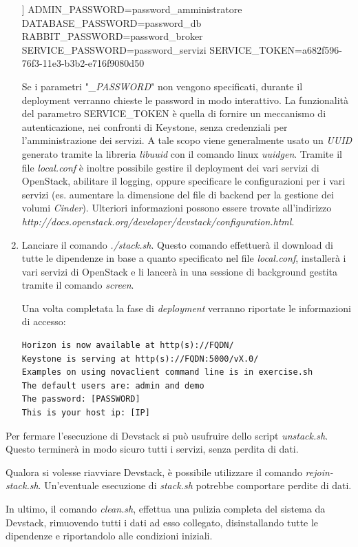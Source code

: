 \documentclass[../main.tex]{subfiles}
\begin{document}
\begin{enumerate}
\begin{python}
[[local|localrc]]
ADMIN_PASSWORD=password_amministratore
DATABASE_PASSWORD=password_db
RABBIT_PASSWORD=password_broker
SERVICE_PASSWORD=password_servizi
SERVICE_TOKEN=a682f596-76f3-11e3-b3b2-e716f9080d50
\end{python}
Se i parametri "\textit{\_PASSWORD}" non vengono specificati, durante il deployment verranno chieste le password in modo interattivo.
La funzionalità del parametro SERVICE\_TOKEN è quella di fornire un meccanismo di autenticazione, nei confronti di Keystone, senza credenziali per l'amministrazione dei servizi. A tale scopo viene generalmente usato un \textit{UUID} generato tramite la libreria \textit{libuuid} con il comando linux \textit{uuidgen}.
Tramite il file \textit{local.conf} è inoltre possibile gestire il deployment dei vari servizi di OpenStack, abilitare il logging, oppure specificare le configurazioni per i vari servizi (es. aumentare la dimensione del file di backend per la gestione dei volumi \textit{Cinder}).
Ulteriori informazioni possono essere trovate all'indirizzo \textit{http://docs.openstack.org/developer/devstack/configuration.html}.
\item Lanciare il comando \textit{./stack.sh}.
Questo comando effettuerà il download di tutte le dipendenze in base a quanto specificato nel file \textit{local.conf}, installerà i vari servizi di OpenStack e li lancerà in una sessione di background gestita tramite il comando \textit{screen}.

Una volta completata la fase di \textit{deployment} verranno riportate le informazioni di accesso:
\begin{verbatim}
Horizon is now available at http(s)://FQDN/
Keystone is serving at http(s)://FQDN:5000/vX.0/
Examples on using novaclient command line is in exercise.sh
The default users are: admin and demo
The password: [PASSWORD]
This is your host ip: [IP]
\end{verbatim}
\end{enumerate}
Per fermare l'esecuzione di Devstack si può usufruire dello script \textit{unstack.sh}. Questo terminerà in modo sicuro tutti i servizi, senza perdita di dati.

Qualora si volesse riavviare Devstack, è possibile utilizzare il comando \textit{rejoin-stack.sh}. Un'eventuale esecuzione di \textit{stack.sh} potrebbe comportare perdite di dati.

In ultimo, il comando \textit{clean.sh}, effettua una pulizia completa del sistema da Devstack, rimuovendo tutti i dati ad esso collegato, disinstallando tutte le dipendenze e riportandolo alle condizioni iniziali.
\end{document}
